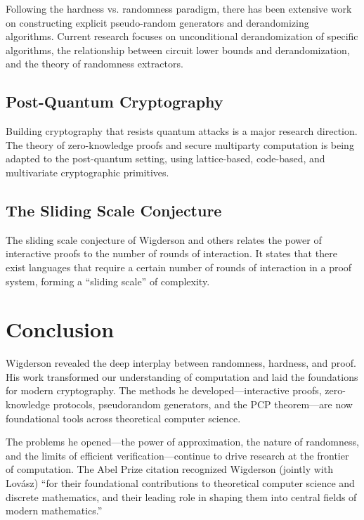 Following the hardness vs. randomness paradigm, there has been extensive work on constructing explicit pseudo-random generators and derandomizing algorithms. Current research focuses on unconditional derandomization of specific algorithms, the relationship between circuit lower bounds and derandomization, and the theory of randomness extractors.

\subsection{Post-Quantum Cryptography}

Building cryptography that resists quantum attacks is a major research direction. The theory of zero-knowledge proofs and secure multiparty computation is being adapted to the post-quantum setting, using lattice-based, code-based, and multivariate cryptographic primitives.

\subsection{The Sliding Scale Conjecture}

The sliding scale conjecture of Wigderson and others relates the power of interactive proofs to the number of rounds of interaction. It states that there exist languages that require a certain number of rounds of interaction in a proof system, forming a ``sliding scale'' of complexity.

\section{Conclusion}

Wigderson revealed the deep interplay between randomness, hardness, and proof. His work transformed our understanding of computation and laid the foundations for modern cryptography. The methods he developed---interactive proofs, zero-knowledge protocols, pseudorandom generators, and the PCP theorem---are now foundational tools across theoretical computer science.

The problems he opened---the power of approximation, the nature of randomness, and the limits of efficient verification---continue to drive research at the frontier of computation. The Abel Prize citation recognized Wigderson (jointly with Lov\'asz) ``for their foundational contributions to theoretical computer science and discrete mathematics, and their leading role in shaping them into central fields of modern mathematics.''

